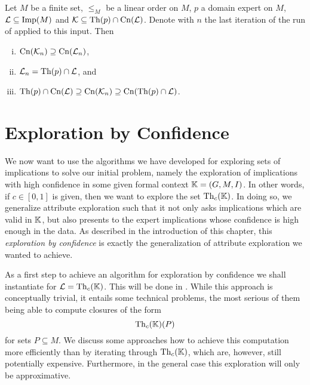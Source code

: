 \begin{Theorem}
  \label{thm:explore-implications-weaker-version-all-other-properties}
  Let $M$ be a finite set, $\leq_{M}$ be a linear order on $M$, $p$ a domain expert on
  $M$, $\mathcal{L} \subseteq \operatorname{Imp}(M)$ and $\mathcal{K} \subseteq \operatorname{Th}(p) \cap
  \operatorname{Cn}(\mathcal{L})$.  Denote with $n$ the last iteration of the run of
   applied to this input.  Then
  \begin{enumerate}[i. ]
  \item $\operatorname{Cn}(\mathcal{K}_{n}) \supseteq \operatorname{Cn}(\mathcal{L}_{n})$,
  \item $\mathcal{L}_{n} = \operatorname{Th}(p) \cap \mathcal{L}$, and
  \item $\operatorname{Th}(p) \cap \operatorname{Cn}(\mathcal{L}) \supseteq \operatorname{Cn}(\mathcal{K}_{n}) \supseteq \operatorname{Cn}(\operatorname{Th}(p) \cap \mathcal{L})$.
  \end{enumerate}
\end{Theorem}

\section{Exploration by Confidence}
\label{sec:expl-conf}

We now want to use the algorithms we have developed for exploring sets of implications to
solve our initial problem, namely the exploration of implications with high confidence in
some given formal context ${\mathbb{K}} = (G, M, I)$.  In other words, if $c \in [0,1]$ is
given, then we want to explore the set $\operatorname{Th}_{c}({\mathbb{K}})$.  In doing so, we generalize
attribute exploration such that it not only asks implications which are valid in ${\mathbb{K}}$,
but also presents to the expert implications whose confidence is high enough in the data.
As described in the introduction of this chapter, this \emph{exploration by confidence} is
exactly the generalization of attribute exploration we wanted to achieve.

As a first step to achieve an algorithm for exploration by confidence we shall instantiate
 for $\mathcal{L} = \operatorname{Th}_{c}({\mathbb{K}})$.  This will be done in
.  While this approach is conceptually trivial, it entails some
technical problems, the most serious of them being able to compute closures of the form
\begin{equation*}
  \operatorname{Th}_{c}({\mathbb{K}})(P)
\end{equation*}
for sets $P \subseteq M$.  We discuss some approaches how to achieve this computation more
efficiently than by iterating through $\operatorname{Th}_{c}({\mathbb{K}})$, which are, however, still
potentially expensive.  Furthermore, in the general case this exploration will only be
approximative.

